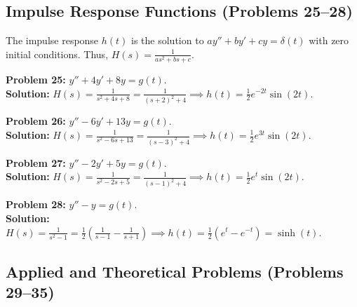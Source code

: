 \documentclass[11pt, letterpaper]{article}
\theoremstyle{definition}
\theoremstyle{remark}
\begin{document}
\begin{center}
\end{center}

\subsection{Impulse Response Functions (Problems 25--28)}
The impulse response $h(t)$ is the solution to $ay''+by'+cy = \delta(t)$ with zero initial conditions. Thus, $H(s) = \frac{1}{as^2+bs+c}$.

\textbf{Problem 25:} $y'' + 4y' + 8y = g(t)$.
\\[4pt]
\textbf{Solution:} $H(s) = \frac{1}{s^2+4s+8} = \frac{1}{(s+2)^2+4} \implies h(t) = \frac{1}{2}e^{-2t}\sin(2t)$.

\textbf{Problem 26:} $y'' - 6y' + 13y = g(t)$.
\\[4pt]
\textbf{Solution:} $H(s) = \frac{1}{s^2-6s+13} = \frac{1}{(s-3)^2+4} \implies h(t) = \frac{1}{2}e^{3t}\sin(2t)$.

\textbf{Problem 27:} $y'' - 2y' + 5y = g(t)$.
\\[4pt]
\textbf{Solution:} $H(s) = \frac{1}{s^2-2s+5} = \frac{1}{(s-1)^2+4} \implies h(t) = \frac{1}{2}e^{t}\sin(2t)$.

\textbf{Problem 28:} $y'' - y = g(t)$.
\\[4pt]
\textbf{Solution:} $H(s) = \frac{1}{s^2-1} = \frac{1}{2}\left(\frac{1}{s-1} - \frac{1}{s+1}\right) \implies h(t) = \frac{1}{2}(e^t - e^{-t}) = \sinh(t)$.

\subsection{Applied and Theoretical Problems (Problems 29--35)}
\end{document}
